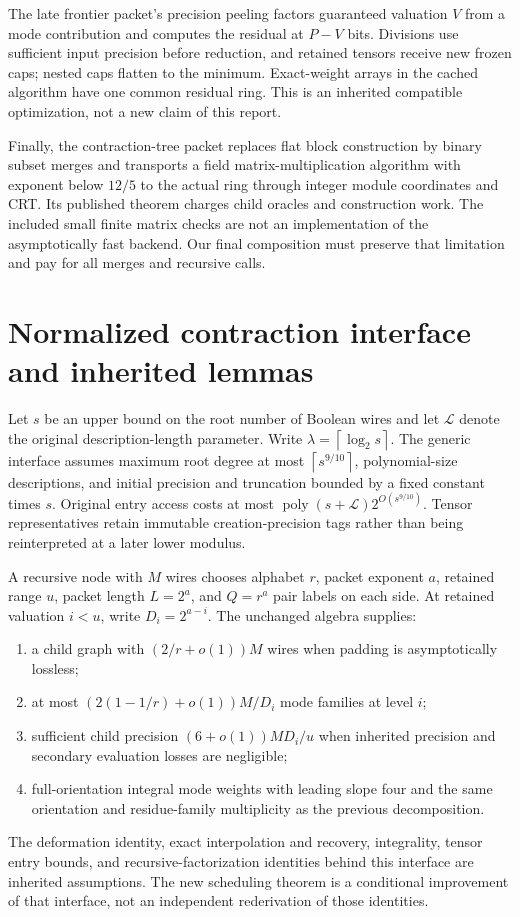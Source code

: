 \documentclass[11pt,letterpaper]{article}
\theoremstyle{remark}\newtheorem{remark}[theorem]{Remark}
\newcommand{\poly}{\operatorname{poly}}\newcommand{\vTwo}{v_2}\newcommand{\ceil}[1]{\left\lceil#1\right\rceil}\newcommand{\floor}[1]{\left\lfloor#1\right\rfloor}\newcommand{\LL}{\mathcal L}\newcommand{\Pin}{ab2fbc9e03d5c3d0ad6dec8686960bfe498b0b06}
\begin{document}
The late frontier packet's precision peeling factors guaranteed valuation
$V$ from a mode contribution and computes the residual at $P-V$ bits. Divisions
use sufficient input precision before reduction, and retained tensors receive
new frozen caps; nested caps flatten to the minimum. Exact-weight arrays in the
cached algorithm have one common residual ring. This is an inherited compatible
optimization, not a new claim of this report.

Finally, the contraction-tree packet replaces flat block construction by binary
subset merges and transports a field matrix-multiplication algorithm with
exponent below $12/5$ to the actual ring through integer module coordinates and
CRT. Its published theorem charges child oracles and construction work. The
included small finite matrix checks are not an implementation of the asymptotically
fast backend. Our final composition must preserve that limitation and pay for
all merges and recursive calls.

\section{Normalized contraction interface and inherited lemmas}
\label{sec:interface}
Let $s$ be an upper bound on the root number of Boolean wires and let $\LL$ denote the original description-length parameter. Write $\lambda=\ceil{\log_2s}$. The generic interface assumes maximum root degree at most $\ceil{s^{9/10}}$, polynomial-size descriptions, and initial precision and truncation bounded by a fixed constant times $s$. Original entry access costs at most $\poly(s+\LL)2^{O(s^{9/10})}$. Tensor representatives retain immutable creation-precision tags rather than being reinterpreted at a later lower modulus.

A recursive node with $M$ wires chooses alphabet $r$, packet exponent $a$, retained range $u$, packet length $L=2^a$, and $Q=r^a$ pair labels on each side. At retained valuation $i<u$, write $D_i=2^{a-i}$. The unchanged algebra supplies:
\begin{enumerate}
\item a child graph with $(2/r+o(1))M$ wires when padding is asymptotically lossless;
\item at most $(2(1-1/r)+o(1))M/D_i$ mode families at level $i$;
\item sufficient child precision $(6+o(1))MD_i/u$ when inherited precision and secondary evaluation losses are negligible;
\item full-orientation integral mode weights with leading slope four and the same orientation and residue-family multiplicity as the previous decomposition.
\end{enumerate}
The deformation identity, exact interpolation and recovery, integrality, tensor entry bounds, and recursive-factorization identities behind this interface are inherited assumptions. The new scheduling theorem is a conditional improvement of that interface, not an independent rederivation of those identities.
\end{document}
